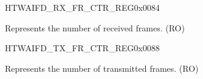 \begin{register}{H}{TWAIFD\_RX\_FR\_CTR\_REG}{0x0084}\label{regdesc:TWAIFDRXFRCTRREG}
%
\regnewline%
\begin{regdesc}\begin{reglist}
\label{fielddesc:TWAIFDRXFRCTRVAL}\item [TWAIFD\_RX\_FR\_CTR\_VAL] Represents the number of received frames. (RO)
\end{reglist}\end{regdesc}
\end{register}


\begin{register}{H}{TWAIFD\_TX\_FR\_CTR\_REG}{0x0088}\label{regdesc:TWAIFDTXFRCTRREG}
%
\regnewline%
\begin{regdesc}\begin{reglist}
\label{fielddesc:TWAIFDTXCTRVAL}\item [TWAIFD\_TX\_CTR\_VAL] Represents the number of transmitted frames. (RO)
\end{reglist}\end{regdesc}
\end{register}


